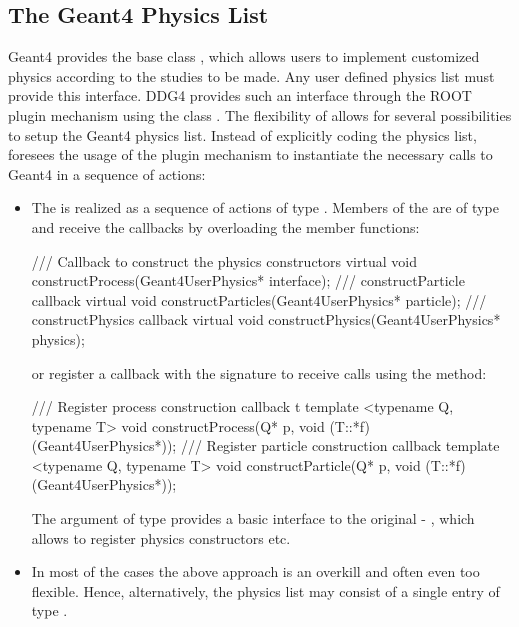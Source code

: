 \documentclass[10pt,a4paper]{article}
\begin{document}
\subsection{The Geant4 Physics List}
\label{sec:ddg4-implementation-physics-list}
\noindent 
Geant4 provides the base class , which allows users
to implement customized physics according to the studies to be made.
Any user defined physics list must provide this interface. DDG4 provides such an interface
through the ROOT plugin mechanism using the class .
The flexibility of \DDG allows for several possibilities to setup the Geant4
physics list. Instead of explicitly coding the physics list, \DDG foresees the
usage of the plugin mechanism to instantiate the necessary calls to Geant4 in a
sequence of actions:
\begin{itemize}
\item The  is realized as a sequence of actions of type 
    {}.
    Members of the 
    {} are of type
    {} and receive the callbacks by overloading 
    the member functions:
\begin{unnumberedcode}
  /// Callback to construct the physics constructors
  virtual void constructProcess(Geant4UserPhysics* interface);
  /// constructParticle callback
  virtual void constructParticles(Geant4UserPhysics* particle);
  /// constructPhysics callback
  virtual void constructPhysics(Geant4UserPhysics* physics);
\end{unnumberedcode}
    or register a callback with the signature {}
    to receive calls using the method:
\begin{unnumberedcode}
  /// Register process construction callback t
  template <typename Q, typename T> void constructProcess(Q* p, void (T::*f)(Geant4UserPhysics*));
  /// Register particle construction callback
  template <typename Q, typename T> void constructParticle(Q* p, void (T::*f)(Geant4UserPhysics*));
\end{unnumberedcode}
    The argument of type 
    {} provides a basic interface to the original
    - , which allows to register physics constructors etc.

\item In most of the cases the above approach is an overkill and often even too flexible.
    Hence, alternatively, the physics list may consist of a single entry of type 
    {}.
\end{itemize}
\end{document}
